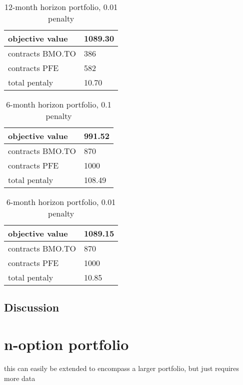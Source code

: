 \documentclass[12pt]{article}
\begin{document}
\begin{table}[H]
	\centering
    \begin{tabular}{|l|l|}
    \hline
    	objective value & 1089.30 \\ \hline
	contracts BMO.TO & 386 \\ \hline
	contracts PFE & 582 \\ \hline
	total pentaly & 10.70 \\ \hline
    \end{tabular}
    \caption {12-month horizon portfolio, 0.01 penalty}
    \label{tab:result_2}
\end{table}

\begin{table}[H]
	\centering
    \begin{tabular}{|l|l|}
    \hline
    	objective value & 991.52\\ \hline
	contracts BMO.TO & 870 \\ \hline
	contracts PFE & 1000 \\ \hline
	total pentaly & 108.49 \\ \hline
    \end{tabular}
    \caption {6-month horizon portfolio, 0.1 penalty}
    \label{tab:result_2}
\end{table}

\begin{table}[H]
	\centering
    \begin{tabular}{|l|l|}
    \hline
    	objective value & 1089.15 \\ \hline
	contracts BMO.TO & 870 \\ \hline
	contracts PFE & 1000 \\ \hline
	total pentaly & 10.85 \\ \hline
    \end{tabular}
    \caption {6-month horizon portfolio, 0.01 penalty}
    \label{tab:result_2}
\end{table}

\subsection{Discussion}

\section{n-option portfolio}
this can easily be extended to encompass a larger portfolio, but just requires more data
\end{document}
